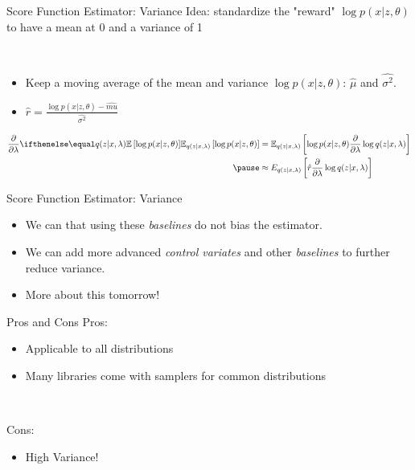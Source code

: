 \begin{frame}{Score Function Estimator: Variance}
Idea: standardize the "reward" $\log p(x|z, \theta)$ to have a mean at 0 and a variance of 1 \pause

~ 

\begin{itemize}
  \setlength\itemsep{0.7em}
    \item Keep a moving average of the mean and variance $\log p(x|z, \theta)$: $\hat{\mu}$ and $\hat{\sigma^2}$. \pause
    \item $\hat{r} = \frac{\log p(x|z, \theta)-\hat{mu}}{\hat{\sigma^2}}$
\end{itemize}

\pause

\begin{small}
\begin{equation*}
\begin{aligned}
\pdv{\lambda}\E[q(z|x,\lambda)]{\log p(x|z,\theta)}
&= \mathbb E_{q(z|x,\lambda)} \left[  \log p(x|z,\theta)  \pdv{\lambda}\log q(z|x,\lambda)\right]\\ \pause
&\approx E_{q(z|x,\lambda)} \left[  \hat{r} \pdv{\lambda}\log q(z|x,\lambda)\right]
\end{aligned}
\end{equation*}
\end{small}

\end{frame}

\begin{frame}{Score Function Estimator: Variance}

\begin{itemize}
    \item We can that using these \emph{baselines} do not bias the estimator. \pause
    \item We can add more advanced \emph{control variates} and other \emph{baselines} to further reduce variance. \pause
    \item More about this tomorrow!
\end{itemize}

\end{frame}

\begin{frame}{Pros and Cons}
Pros:
\begin{itemize}
\item Applicable to all distributions
\item Many libraries come with samplers for common distributions
\end{itemize}
\pause

~

Cons:
\begin{itemize}
\item High Variance!
\end{itemize}
\end{frame}



